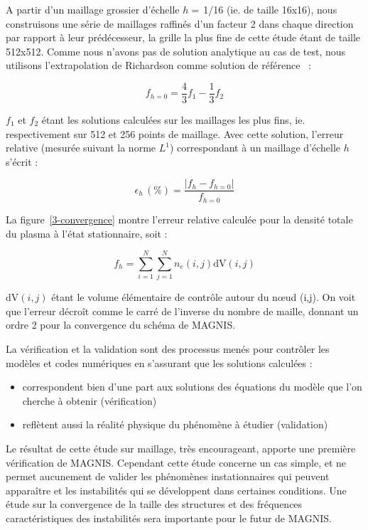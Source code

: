 \begin{refsection}
A partir d'un maillage grossier d'échelle $h=\,$1/16 (ie. de taille 16x16),
nous construisons une série de maillages raffinés d'un facteur 2 dans chaque direction par rapport à leur prédécesseur, la grille la
plus fine de cette étude étant de taille 512x512. Comme nous n'avons pas de
solution analytique au cas de test, nous utilisons l'extrapolation de
Richardson comme solution de référence~\parencite{Roache} :

\begin{equation}
f_{h=0}=\frac{4}{3}f_{1}-\frac{1}{3}f_2
\end{equation}

$f_{1}$ et $f_2$ étant les solutions calculées sur les maillages les plus fins,
ie. respectivement sur 512 et 256 points de maillage. Avec cette solution,
l'erreur relative (mesurée suivant la norme $L^1$) correspondant à un maillage
d'échelle $h$ s'écrit :

\begin{equation}
\epsilon_h\,(\text{\%})=\frac{|f_h-f_{h=0}|}{f_{h=0}}
\end{equation}

La figure~\ref{3-convergence} montre l'erreur relative calculée pour la densité
totale du plasma à l'état stationnaire, soit :

\begin{equation}
f_h=\sum_{i=1}^{N}\sum_{j=1}^{N}n_e(i,j)\text{dV}(i,j)
\end{equation}

$\text{dV}(i,j)$ étant le volume élémentaire de contrôle autour du n\oe ud
(i,j). On voit que l'erreur décroît comme le carré de l'inverse du nombre de
maille, donnant un ordre 2 pour la convergence du schéma de MAGNIS.

La vérification et la validation sont des processus menés
pour contrôler les modèles et codes numériques en s'assurant que les solutions
calculées :

\begin{itemize}
  \item correspondent bien d'une part aux solutions des
  équations du modèle que l'on cherche à obtenir (vérification)
	\item reflètent aussi la réalité
	physique du phénomène à étudier (validation)
	\end{itemize}
	
Le résultat de cette étude sur maillage, très encourageant, apporte une première
vérification de MAGNIS. Cependant cette étude concerne un cas simple,
et ne permet aucunement de valider les phénomènes instationnaires qui peuvent
apparaître et les instabilités qui se développent dans certaines
conditions. Une étude sur la convergence de la taille des structures et des
fréquences caractéristiques des instabilités sera importante pour le futur de
MAGNIS. 


\end{refsection}

